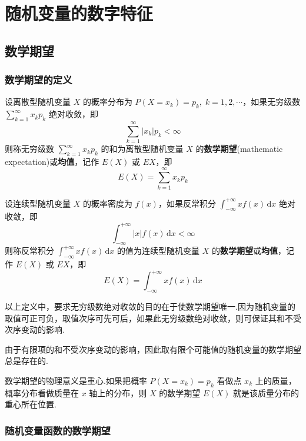 
\chapter{随机变量的数字特征}
\thispagestyle{plain}

\section{数学期望}

\subsection{数学期望的定义}

\begin{definition}
    \indent 设离散型随机变量 $X$ 的概率分布为 $P(X=x_k) = p_k, \; k=1,2,\cdots$，如果无穷级数 $\displaystyle\sum_{k=1}^{\infty} x_k p_k$ 绝对收敛，即
    $$
    \sum_{k=1}^{\infty} |x_k| p_k < \infty
    $$
    则称无穷级数 $\displaystyle\sum_{k=1}^{\infty} x_k p_k$ 的和为离散型随机变量 $X$ 的\textbf{数学期望}(mathematic expectation)或\textbf{均值}，记作 $E(X)$ 或 $EX$，即
    $$
    E(X) = \sum_{k=1}^{\infty} x_k p_k
    $$

    设连续型随机变量 $X$ 的概率密度为 $f(x)$，如果反常积分 $\displaystyle\int_{-\infty}^{+\infty} x f(x) \, \text{d}x$ 绝对收敛，即
    $$
    \int_{-\infty}^{+\infty} |x| f(x) \, \text{d}x < \infty
    $$
    则称反常积分 $\displaystyle\int_{-\infty}^{+\infty} x f(x) \, \text{d}x$ 的值为连续型随机变量 $X$ 的\textbf{数学期望}或\textbf{均值}，记作 $E(X)$ 或 $EX$，即
    $$
    E(X) = \int_{-\infty}^{+\infty} x f(x) \, \text{d}x
    $$
\end{definition}

\begin{note}
    \indent 以上定义中，要求无穷级数绝对收敛的目的在于使数学期望唯一.因为随机变量的取值可正可负，取值次序可先可后，如果此无穷级数绝对收敛，则可保证其和不受次序变动的影响.

    由于有限项的和不受次序变动的影响，因此取有限个可能值的随机变量的数学期望总是存在的.
\end{note}

数学期望的物理意义是重心.如果把概率 $P(X=x_k) = p_k$ 看做点 $x_k$ 上的质量，概率分布看做质量在 $x$ 轴上的分布，则 $X$ 的数学期望 $E(X)$ 就是该质量分布的重心所在位置.

\subsection{随机变量函数的数学期望}

